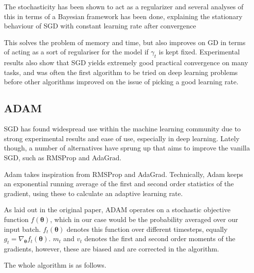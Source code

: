 The stochasticity has been shown to act as a regularizer and several analyses of
this in terms of a Bayesian framework has been done, explaining the stationary
behaviour of SGD with constant learning rate after
convergence\cite{mandt_stochastic_2017, mandt_variational_2016}

This solves the problem of memory and time, but also improves on GD in terms of
acting as a sort of regulariser for the model if $\gamma_t$ is kept fixed.
Experimental results also show that SGD yields extremely good practical
convergence on many tasks, and was often the first algorithm to be tried on deep
learning problems before other algorithms improved on the issue of picking a
good learning rate.

\subsection{ADAM}
SGD has found widespread use within the machine learning community due to strong
experimental results and ease of use, especially in deep learning. Lately
though, a number of alternatives have sprung up that aims to improve the vanilla
SGD, such as RMSProp\cite{Tieleman2012} and AdaGrad\cite{Duchi:EECS-2010-24}.

Adam takes inspiration from RMSProp and AdaGrad. Technically, Adam keeps an
exponential running average of the first and second order statistics of the
gradient, using these to calculate an adaptive learning rate.

As laid out in the original paper, ADAM operates on a stochastic objective
function $f(\bm{\theta})$, which in our case would be the probability averaged
over our input batch. $f_t(\bm{\theta})$ denotes this function over different
timesteps, equally $g_t = \nabla_{\bm{\theta}} f_t(\bm{\theta})$. $m_t$ and
$v_t$ denotes the first and second order moments of the gradients, however,
these are biased and are corrected in the algorithm.

The whole algorithm is as follows.

